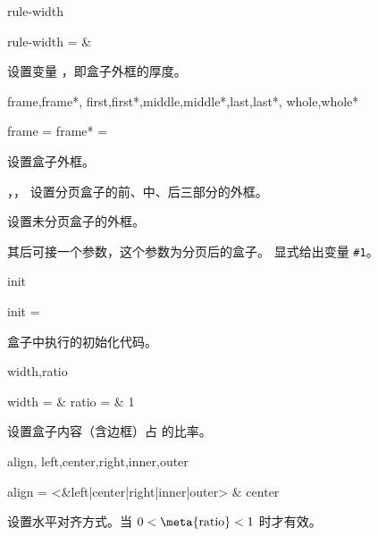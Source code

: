 \documentclass{whudoc}
\begin{document}
\begin{keyval}[path=frame]{rule-width}
  \begin{syntax}
    rule-width =  & \V\fboxrule
  \end{syntax}
设置变量 ，即盒子外框的厚度。
\end{keyval}

\begin{keyval}[path=frame]{frame,frame*,
  first,first*,middle,middle*,last,last*,
  whole,whole*}
  \begin{syntax}
    frame  = 
    frame* = 
  \end{syntax}
 设置盒子外框。

，， 设置分页盒子的前、中、后三部分的外框。

 设置未分页盒子的外框。

 其后可接一个参数，这个参数为分页后的盒子。
 显式给出变量 \verb|#1|。
\end{keyval}

\begin{keyval}[path=frame]{init}
  \begin{syntax}
    init = 
  \end{syntax}
盒子中执行的初始化代码。
\end{keyval}

\begin{keyval}[path=frame]{width,ratio}
  \begin{syntax}
    width =  & \V\textwidth
    ratio =  & 1
  \end{syntax}
 设置盒子内容（含边框）占  的比率。
\end{keyval}

\begin{keyval}[path=frame]{align,
  left,center,right,inner,outer}
  \begin{syntax}
    align = <&left|center|right|inner|outer> & center 
  \end{syntax}
设置水平对齐方式。当 $ 0 <{} \text{\meta{ratio}} {}< 1 $ 时才有效。
\end{keyval}

\begin{xample}
\begin{Framed}[ratio=.8,center,
  rule-width=2pt,
  frame={\setlength{\fboxsep}{\whuframesep}%
          \setlength{\fboxrule}{\whuframerule}%
          \fcolorbox{purple}{cyan!50}}]
\zhlipsum[9][name=zhufu]
\end{Framed}
\stopxamplecode
\xampleprint 
\vskip 1pt 
\end{xample}
\end{document}
